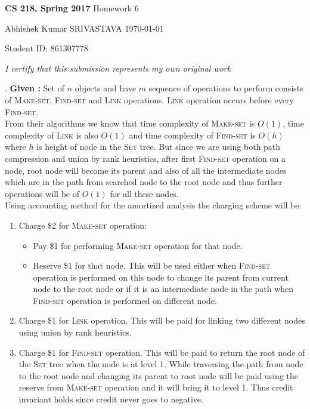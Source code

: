 \documentclass[a4paper,11pt]{article}
\renewcommand{\maketitle}{%
	
	\Large
 	\textbf{CS 218, Spring 2017}
 	\hfill
 	Homework 6
 	\par
 	
	\Large
	Abhishek Kumar SRIVASTAVA
	\hfill
	\normalsize
	\today
 	\par
 	Student ID: 861307778
 	\par
 	
 	\begin{center}

 	\vspace{.2in}
 	
 	\textit{I certify that this submission represents my own original work }
 	\par
	\vspace{.2in}
	\makebox[2.4in]{\hrulefill}
	\par

 	\end{center}
 	
 	\hrulefill
 	\par \vspace{2ex}
 	}
\theoremstyle{quest}
\newenvironment{solution}[2][Solution]{\begin{trivlist}
		\item[\hskip \labelsep {\bfseries #1}\hskip \labelsep {\bfseries #2.}]}{\end{trivlist}}
\begin{document}
\thispagestyle{empty}
	
\maketitle

\begin{solution}1. \textbf{Given :} Set of $n$ objects and have $m$ sequence of operations to perform consists of \textsc{Make-set}, \textsc{Find-set} and \textsc{Link} operations. \textsc{Link} operation occurs before every \textsc{Find-set}.\\
	
From their algorithms we know that time complexity of \textsc{Make-set} is $O(1)$, time complexity of \textsc{Link} is also $O(1)$ and time complexity of \textsc{Find-set} is $O(h)$ where $h$ is height of node in the \textsc{Set} tree. But since we are using both path compression and union by rank heuristics, after first \textsc{Find-set} operation on a node, root node will become its parent and also of all the intermediate nodes which are in the path from searched node to the root node and thus further operations will be of $O(1)$ for all these nodes.\\

Using accounting method for the amortized analysis the charging scheme will be:
\begin{enumerate}
	\item Charge \$2 for \textsc{Make-set} operation:
	\begin{itemize}
	\item Pay \$1 for performing \textsc{Make-set} operation for that node.
	\item Reserve \$1 for that node. This will be used either when \textsc{Find-set} operation is performed on this node to change its parent from current node to the root node or if it is an intermediate node in the path when \textsc{Find-set} operation is performed on different node.   
	\end{itemize}
	\item Charge \$1 for \textsc{Link} operation. This will be paid for linking two different nodes using union by rank heuristics.
	\item Charge \$1 for \textsc{Find-set} operation. This will be paid to return the root node of the \textsc{Set} tree when the node is at level 1. While traversing the path from node to the root node and changing its parent to root node will be paid using the reserve from \textsc{Make-set} operation and it will bring it to level 1. Thus credit invariant holds since credit never goes to negative.  
\end{enumerate}


\end{solution}
\end{document}
